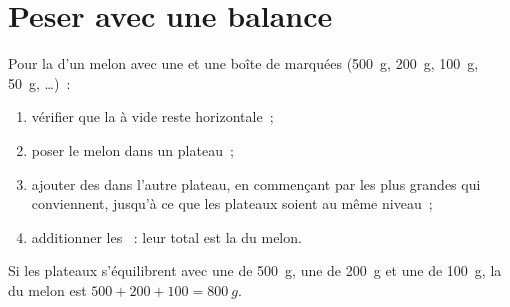 \section{Peser avec une balance}

\begin{method}\label{met:g3:measuring-mass:weigh}
Pour  la  d'un melon avec une  et une boîte de
 marquées (\qty{500}{g}, \qty{200}{g}, \qty{100}{g},
\qty{50}{g}, \dots)~:
\begin{enumerate}
  \item vérifier que la  à vide reste horizontale~;
  \item poser le melon dans un plateau~;
  \item ajouter des  dans l'autre plateau, en commençant par
        les plus grandes qui conviennent, jusqu'à ce que les plateaux
        soient au même niveau~;
  \item additionner les ~: leur total est la  du melon.
\end{enumerate}
Si les plateaux s'équilibrent avec une  de \qty{500}{g}, une de
\qty{200}{g} et une de \qty{100}{g}, la  du melon est
$500 + 200 + 100 = \qty{800}{g}$.
\end{method}

